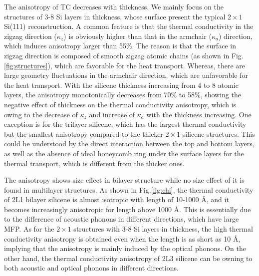 \documentclass[aps,prb,twocolumn,showpacs,amsmath,amssymb]{revtex4-1}
\newcommand{\angstrom}{\mbox{\normalfont\AA}}
\begin{document}
The anisotropy of TC decreases with thickness. We mainly focus on the structures of 3-8 Si layers in thickness, whose surface present the typical $2 \times 1$ Si(111) reconstruction. A common feature is that the thermal conductivity in the zigzag direction ($\kappa_z$) is obviously higher than that  in the armchair ($\kappa_a$) direction, which induces anisotropy larger than 55\%.
The reason is that the surface in zigzag direction is composed of smooth zigzag atomic chains (as shown in Fig.\ref{fig:structures}), which are favorable for the heat transport. Whereas,  there are large geometry fluctuations in the armchair direction, which are unfavorable for the heat transport.
With the silicene thickness increasing from 4 to 8 atomic layers, the anisotropy monotonically decreases from 70\% to 58\%, showing the negative  effect of thickness on the thermal conductivity anisotropy, which  is owing to the decrease of $\kappa_z$ and increase of $\kappa_a$  with the  thickness increasing.
One exception is for the trilayer silicene, which has the largest thermal conductivity but the smallest  anisotropy compared to the thicker  $2\times1$ silicene structures.  This could be understood by the direct interaction between the top and bottom layers, as well as the absence of ideal honeycomb ring under the surface layers  for the thermal transport, which is different from the thicker ones\cite{Guo2015Structural}.

The anisotropy shows size effect in bilayer structure while no size effect of it is found in multilayer structures. As shown in Fig.\ref{fig:chi}, the thermal conductivity of  2L1 bilayer silicene is almost isotropic with length of 10-1000 \angstrom, and it becomes increasingly anisotropic for length  above 1000  \angstrom. This is essentially due to the difference of acoustic phonons in different directions,  which have large MFP.  As for the $2\times1$ structures with 3-8 Si layers in thickness, the high thermal conductivity anisotropy is obtained even when the length is as short as 10 \angstrom, implying that the anisotropy is  mainly induced by the optical phonons. On the other hand, the thermal conductivity anisotropy of 2L3 silicene can be owning to both acoustic and  optical phonons in different directions.
\end{document}
